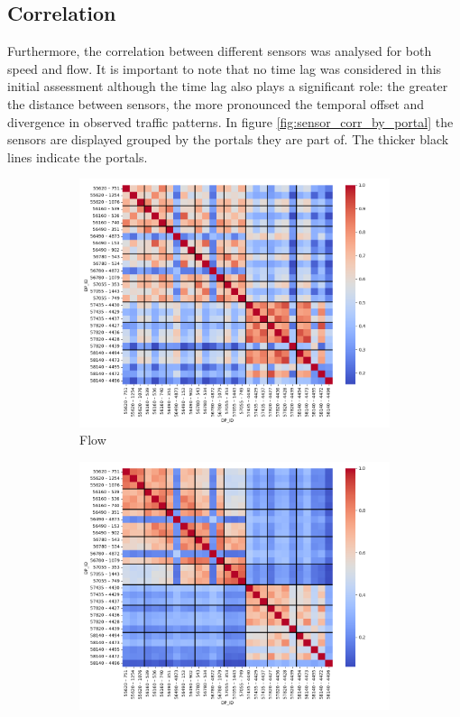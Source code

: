 	\subsection{Correlation}
	Furthermore, the correlation between different sensors was analysed for both speed and flow. It is important to note that no time lag was considered in this initial assessment although the time lag also plays a significant role: %
	the greater the distance between sensors, the more pronounced the temporal offset and divergence in observed traffic patterns. \newline 
	In figure \ref{fig:sensor_corr_by_portal} the sensors are displayed grouped by the portals they are part of. The thicker black lines indicate the portals.
	\begin{figure}[H]
		\centering
		\begin{subfigure}{0.49 \linewidth}
			\includegraphics[width=\textwidth]{../Plots/Flow/sensor_corr_by_portal}
			\caption{Flow}
		\end{subfigure}
		\begin{subfigure}{0.49 \linewidth}
			\includegraphics[width=\textwidth]{../Plots/Speed/sensor_corr_by_portal}

\end{subfigure}
\end{figure}
